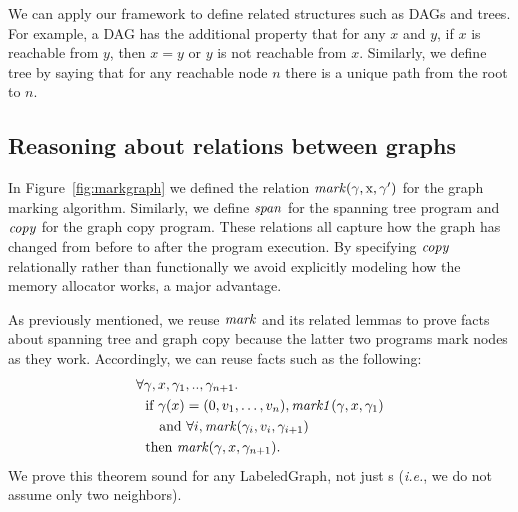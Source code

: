 We can apply our framework to define related structures such as DAGs and trees.
For example, a DAG has the additional property that for any $x$ and $y$, 
if $x$ is reachable from $y$, then $x = y$ or $y$ is not reachable
from $x$.  Similarly, we define tree by saying that for any reachable node $n$ there is
a unique path from the root to $n$.

\subsection{Reasoning about relations between graphs} %

In Figure~\ref{fig:markgraph} we defined the relation $\mathit{mark}(\gamma, \text{x}, \gamma')$
for the graph marking algorithm.  Similarly, we define $\mathit{span}$ for the spanning tree program
and $\mathit{copy}$ for the graph copy program.
These relations all capture how the graph has changed from before to after the program
execution.  By specifying $\mathit{copy}$ relationally
rather than functionally we avoid explicitly modeling how the memory allocator works, a major advantage.

As previously mentioned, we reuse $\mathit{mark}$ and its
related lemmas to prove facts about spanning tree and graph copy
because the latter two programs mark nodes as they work.
Accordingly, we can reuse facts such as the following:
\begin{equation*}
\begin{split}
& \forall \gamma,  x, \gamma_1, .., \gamma_{n+1}. \\
& ~~ \text{if } \gamma(x)=(0, v_1, \dots,v_n),   \mathit{mark1}(\gamma, x, \gamma_1) \\
& ~~~~ \text{ and } \forall i, \mathit{mark}(\gamma_i,v_i,\gamma_{i+1}) \\
& ~~ \text{then } \mathit{mark}(\gamma,x,\gamma_{n+1}).
\end{split}
\end{equation*}
We prove this theorem sound for any LabeledGraph, not just
s (\emph{i.e.}, we do not assume only two neighbors). 


